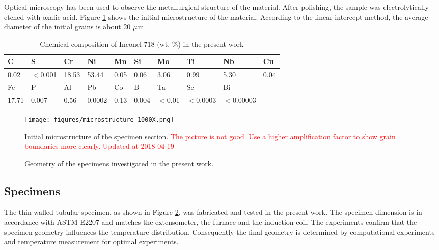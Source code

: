 \documentclass[preprint,5p,twocolumn,11pt,sort&compress]{elsarticle}
\newcommand{\marked}[1]{\textcolor{red}{#1}}
\begin{document}
Optical microscopy has been used to observe the metallurgical structure of the material. After polishing, the sample was electrolytically etched with oxalic acid. Figure \ref{Fig:microstructure_200X} shows the initial microstructure of the material. According to the linear intercept method, the average diameter of the initial grains is about 20 $\rm{\mu }$m.

\begin{table*}[htbp]
  \centering
  \caption{Chemical composition of Inconel 718 (wt. \%) in the present work}\vspace{0.1cm}
    \begin{tabular}{llllllllll}
    \hline
    C     & S     & Cr    & Ni    & Mn    & Si    & Mo    & Ti    & Nb    & Cu \\
    \hline
    0.02  & $<$0.001 & 18.53 & 53.44 & 0.05  & 0.06  & 3.06  & 0.99  & 5.30  & 0.04 \\
    \hline
    Fe    & P     & Al    & Pb    & Co    & B     & Ta    & Se    & Bi    &  \\
    \hline
    17.71 & 0.007 & 0.56  & 0.0002 & 0.13  & 0.004 & $<$0.01 & $<$0.0003 & $<$0.00003 &  \\
    \hline
    \end{tabular}%
  \label{Tab:ChemicalCompositionofIN718}%
\end{table*}%

\begin{figure}[t]
\centering
\texttt{[image: figures/microstructure\_1000X.png]}
\caption{Initial microstructure of the specimen section. \marked{The picture is not good. Use a higher amplification factor to show grain boundaries more clearly. Updated at 2018 04 19}}
\label{Fig:microstructure_200X}
\end{figure}
\begin{figure}%
\caption{Geometry of the specimens investigated in the present work.}
\label{Fig:Specimen}
\end{figure}

\subsection{Specimens}
The thin-walled tubular specimen, as shown in Figure \ref{Fig:Specimen}, was fabricated and tested in the present work. The specimen dimension is in accordance with ASTM E2207 \cite{ASTM2014} and matches the extensometer, the furnace and the induction coil. The experiments confirm that the specimen geometry influences the temperature distribution. Consequently the final geometry is determined by computational experiments and temperature measurement for optimal experiments.
\end{document}
